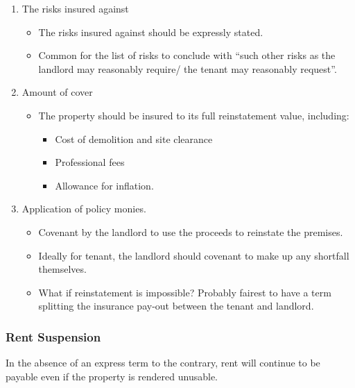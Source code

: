 \documentclass[
]{article}
\newenvironment{Shaded}{}{}
\newcommand{\NormalTok}[1]{#1}
\providecommand{\tightlist}{%
  \setlength{\itemsep}{0pt}\setlength{\parskip}{0pt}}
\begin{document}
\begin{enumerate}
\def\labelenumi{\arabic{enumi}.}
\tightlist
\item
  The risks insured against

  \begin{itemize}
  \tightlist
  \item
    The risks insured against should be expressly stated.
  \item
    Common for the list of risks to conclude with ``such other risks as
    the landlord may reasonably require/ the tenant may reasonably
    request''.
  \end{itemize}
\item
  Amount of cover

  \begin{itemize}
  \tightlist
  \item
    The property should be insured to its full reinstatement value,
    including:

    \begin{itemize}
    \tightlist
    \item
      Cost of demolition and site clearance
    \item
      Professional fees
    \item
      Allowance for inflation.
    \end{itemize}
  \end{itemize}
\item
  Application of policy monies.

  \begin{itemize}
  \tightlist
  \item
    Covenant by the landlord to use the proceeds to reinstate the
    premises.
  \item
    Ideally for tenant, the landlord should covenant to make up any
    shortfall themselves.
  \item
    What if reinstatement is impossible? Probably fairest to have a term
    splitting the insurance pay-out between the tenant and landlord.
  \end{itemize}
\end{enumerate}

\hypertarget{rent-suspension}{%
\subsubsection{Rent Suspension}\label{rent-suspension}}

\begin{Shaded}
\begin{Highlighting}[]
\NormalTok{In the absence of an express term to the contrary, rent will continue to be payable even if the property is rendered unusable.}
\end{Highlighting}
\end{Shaded}
\end{document}
